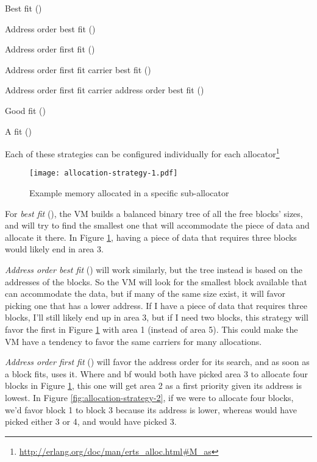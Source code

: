 \begin{enumerate*}
    \item Best fit ()
    \item Address order best fit ()
    \item Address order first fit ()
    \item Address order first fit carrier best fit ()
    \item Address order first fit carrier address order best fit ()
    \item Good fit ()
    \item A fit ()
\end{enumerate*}

Each of these strategies can be configured individually for each  allocator\footnote{\href{http://erlang.org/doc/man/erts\_alloc.html\#M\_as}{http://erlang.org/doc/man/erts\_alloc.html\#M\_as}}

\begin{figure}
  \texttt{[image: allocation-strategy-1.pdf]}%
  \centering%
  \caption{Example memory allocated in a specific sub-allocator}%
   \label{fig:allocation-strategy-1}
\end{figure}
\FloatBarrier

For \emph{best fit} (), the VM builds a balanced binary tree of all the free blocks' sizes, and will try to find the smallest one that will accommodate the piece of data and allocate it there. In Figure \ref{fig:allocation-strategy-1}, having a piece of data that requires three blocks would likely end in area 3.

\emph{Address order best fit} () will work similarly, but the tree instead is based on the addresses of the blocks. So the VM will look for the smallest block available that can accommodate the data, but if many of the same size exist, it will favor picking one that has a lower address. If I have a piece of data that requires three blocks, I'll still likely end up in area 3, but if I need two blocks, this strategy will favor the first  in Figure \ref{fig:allocation-strategy-1} with area 1 (instead of area 5). This could make the VM have a tendency to favor the same carriers for many allocations.

\emph{Address order first fit} () will favor the address order for its search, and as soon as a block fits,  uses it. Where  and bf would both have picked area 3 to allocate four blocks in Figure \ref{fig:allocation-strategy-1}, this one will get area 2 as a first priority given its address is lowest. In Figure \ref{fig:allocation-strategy-2}, if we were to allocate four blocks, we'd favor block 1 to block 3 because its address is lower, whereas  would have picked either 3 or 4, and  would have picked 3.

